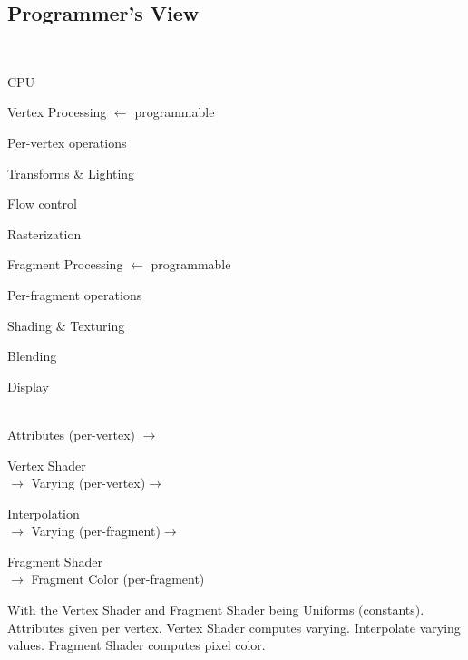 \begin{compactdesc}
\section{Programmer's View} 
\item[\lp{Contemporary pipeline}]\hfill\\
\begin{enumerate*}[label=\protect\circled{\arabic*},itemjoin=]
	\item CPU\\ 
	\item Vertex Processing $\leftarrow$ programmable\\
		\begin{enumerate*}[label=\quad\protect\circled{\alph*},itemjoin=]
			\item Per-vertex operations\\
			\item Transforms \& Lighting\\
			\item Flow control\\
		\end{enumerate*}
	\item Rasterization\\
	\item Fragment Processing $\leftarrow$ programmable\\
		\begin{enumerate*}[label=\quad\protect\circled{\alph*},itemjoin=]
			\item Per-fragment operations\\
			\item Shading \& Texturing\\
			\item Blending\\
		\end{enumerate*}
	\item Display\\
\end{enumerate*}
\item[\lp{Programming with ``shaders''}] \hfill\\
			Attributes (per-vertex) $\to$\\
	\begin{enumerate*}[label=\protect\circled{\arabic*},itemjoin=]
		\item Vertex Shader\\
			$\to$ Varying (per-vertex)$\to$\\
		\item Interpolation\\
			$\to$ Varying (per-fragment)$\to$\\
		\item Fragment Shader\\
			$\to$ Fragment Color (per-fragment)\\
	\end{enumerate*}
	With the Vertex Shader and Fragment Shader being Uniforms (constants). Attributes given per vertex. Vertex Shader computes varying. Interpolate varying values. Fragment Shader computes pixel color.

\end{compactdesc}
